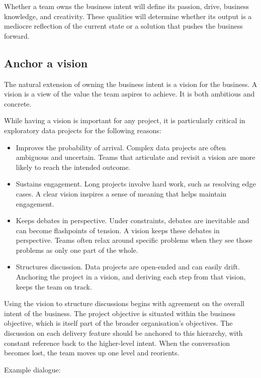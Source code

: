 \documentclass[10pt,openany,10pt]{book}
\begin{document}
Whether a team owns the business intent will define its passion, drive,
business knowledge, and creativity. These qualities will determine
whether its output is a mediocre reflection of the current state or a
solution that pushes the business forward.

\subsection{Anchor a vision}\label{anchor-a-vision}

The natural extension of owning the business intent is a vision for the
business. A vision is a view of the value the team aspires to achieve.
It is both ambitious and concrete.

While having a vision is important for any project, it is particularly
critical in exploratory data projects for the following reasons:

\begin{itemize}
\item
  Improves the probability of arrival. Complex data projects are often
  ambiguous and uncertain. Teams that articulate and revisit a vision
  are more likely to reach the intended outcome.
\item
  Sustains engagement. Long projects involve hard work, such as
  resolving edge cases. A clear vision inspires a sense of meaning that
  helps maintain engagement.
\item
  Keeps debates in perspective. Under constraints, debates are
  inevitable and can become flashpoints of tension. A vision keeps these
  debates in perspective. Teams often relax around specific problems
  when they see those problems as only one part of the whole.
\item
  Structures discussion. Data projects are open-ended and can easily
  drift. Anchoring the project in a vision, and deriving each step from
  that vision, keeps the team on track.
\end{itemize}

Using the vision to structure discussions begins with agreement on the
overall intent of the business. The project objective is situated within
the business objective, which is itself part of the broader
organisation's objectives. The discussion on each delivery feature
should be anchored to this hierarchy, with constant reference back to
the higher-level intent. When the conversation becomes lost, the team
moves up one level and reorients.

Example dialogue:
\end{document}
